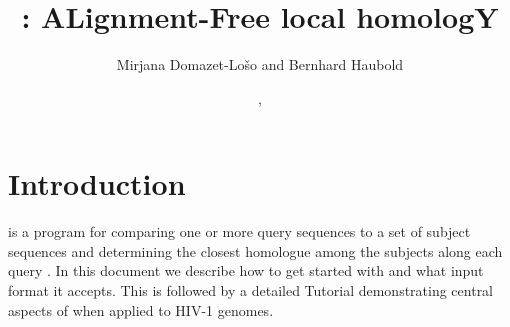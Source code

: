 \documentclass{article}
\begin{document}
\title{: ALignment-Free local homologY}
\author{Mirjana Domazet-Lo\v{s}o and Bernhard Haubold}
\date{\!\!, }
\maketitle

\section{Introduction}
 is a program for comparing one or more query sequences to a
set of subject sequences and determining the closest homologue among
the subjects along each query \cite{dom11:ali}. In this document we 
describe how to get started with  and what input format it
accepts. This is followed by a detailed Tutorial demonstrating central
aspects of  when applied to HIV-1 genomes. 
\end{document}
